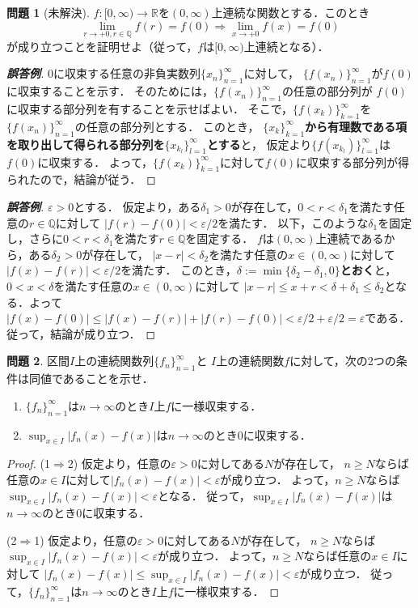 \documentclass{jsarticle}
\theoremstyle{definition}
\newtheorem{qst}{問題}
\begin{document}
\begin{qst}[未解決]
$f\colon[0,\infty)\to\mathbb{R}$を$(0,\infty)$上連続な関数とする．このとき
\[ \lim_{r\to+0, r\in\mathbb{Q}}f(r)=f(0) \Rightarrow \lim_{x\to+0}f(x)=f(0) \]
が成り立つことを証明せよ（従って，$f$は$[0,\infty)$上連続となる）．
\end{qst}
\begin{proof}[\textbf{誤答例}]
0に収束する任意の非負実数列$\{x_n\}_{n=1}^\infty$に対して，
$\{f(x_n)\}_{n=1}^\infty$が$f(0)$に収束することを示す．
そのためには，$\{f(x_n)\}_{n=1}^\infty$の任意の部分列が
$f(0)$に収束する部分列を有することを示せばよい．
そこで，$\{f(x_k)\}_{k=1}^\infty$を$\{f(x_n)\}_{n=1}^\infty$の任意の部分列とする．
このとき，
\textbf{$\{x_k\}_{k=1}^\infty$から有理数である項を取り出して得られる部分列を$\{x_{k_l}\}_{l=1}^\infty$とする}と，
仮定より$\{f(x_{k_l})\}_{l=1}^\infty$は$f(0)$に収束する．
よって，$\{f(x_k)\}_{k=1}^\infty$に対して$f(0)$に収束する部分列が得られたので，結論が従う．
\end{proof}
\begin{proof}[\textbf{誤答例}]
$\varepsilon>0$とする．
仮定より，ある$\delta_1>0$が存在して，$0<r<\delta_1$を満たす任意の$r\in\mathbb{Q}$に対して
$|f(r)-f(0)|<\varepsilon/2$を満たす．
以下，このような$\delta_1$を固定し，さらに$0<r<\delta_1$を満たす$r\in\mathbb{Q}$を固定する．
$f$は$(0,\infty)$上連続であるから，ある$\delta_2>0$が存在して，
$|x-r|<\delta_2$を満たす任意の$x\in(0,\infty)$に対して$|f(x)-f(r)|<\varepsilon/2$を満たす．
このとき，\textbf{$\delta:=\min\{\delta_2-\delta_1,0\}$とおく}と，
$0<x<\delta$を満たす任意の$x\in(0,\infty)$に対して
$|x-r|\leq x+r<\delta+\delta_1\leq\delta_2$となる．よって
$|f(x)-f(0)|\leq|f(x)-f(r)|+|f(r)-f(0)|<\varepsilon/2+\varepsilon/2=\varepsilon$である．
従って，結論が成り立つ．
\end{proof}

\begin{qst}
区間$I$上の連続関数列$\{f_n\}_{n=1}^\infty$と
$I$上の連続関数$f$に対して，次の2つの条件は同値であることを示せ．
\begin{enumerate}
\item$\{f_n\}_{n=1}^\infty$は$n\to\infty$のとき$I$上$f$に一様収束する．
\item$\displaystyle\sup_{x\in I}|f_n(x)-f(x)|$は$n\to\infty$のとき0に収束する．
\end{enumerate}
\end{qst}
\begin{proof}
(1$\Rightarrow$2)
仮定より，任意の$\varepsilon>0$に対してある$N$が存在して，
$n\geq N$ならば任意の$x\in I$に対して$|f_n(x)-f(x)|<\varepsilon$が成り立つ．
よって，$n\geq N$ならば$\displaystyle\sup_{x\in I}|f_n(x)-f(x)|<\varepsilon$となる．
従って，$\displaystyle\sup_{x\in I}|f_n(x)-f(x)|$は$n\to\infty$のとき0に収束する．

(2$\Rightarrow$1)
仮定より，任意の$\varepsilon>0$に対してある$N$が存在して，
$n\geq N$ならば$\displaystyle\sup_{x\in I}|f_n(x)-f(x)|<\varepsilon$が成り立つ．
よって，$n\geq N$ならば任意の$x\in I$に対して
$|f_n(x)-f(x)|\leq\displaystyle\sup_{x\in I}|f_n(x)-f(x)|<\varepsilon$が成り立つ．
従って，$\{f_n\}_{n=1}^\infty$は$n\to\infty$のとき$I$上$f$に一様収束する．
\end{proof}
\end{document}

